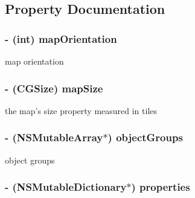 \subsection{Property Documentation}
\hypertarget{interface_c_c_t_m_x_tiled_map_a68fcccfad8cdc9997041c92e601dff76}{
\subsubsection[{map\-Orientation}]{\setlength{\rightskip}{0pt plus 5cm}-\/ (int) {\bf map\-Orientation}}}\label{interface_c_c_t_m_x_tiled_map_a68fcccfad8cdc9997041c92e601dff76}
map orientation \hypertarget{interface_c_c_t_m_x_tiled_map_a2dcb62f1acc4639fc7ba2e8045e53113}{
\subsubsection[{map\-Size}]{\setlength{\rightskip}{0pt plus 5cm}-\/ (C\-G\-Size) {\bf map\-Size}}}\label{interface_c_c_t_m_x_tiled_map_a2dcb62f1acc4639fc7ba2e8045e53113}
the map's size property measured in tiles \hypertarget{interface_c_c_t_m_x_tiled_map_a0e4d5c1ec0940e6bc4dcc7a253af8da5}{
\subsubsection[{object\-Groups}]{\setlength{\rightskip}{0pt plus 5cm}-\/ (N\-S\-Mutable\-Array$\ast$) {\bf object\-Groups}}}\label{interface_c_c_t_m_x_tiled_map_a0e4d5c1ec0940e6bc4dcc7a253af8da5}
object groups \hypertarget{interface_c_c_t_m_x_tiled_map_a33c0dc23ec83c6e5c8f6183993ebd59c}{
\subsubsection[{properties}]{\setlength{\rightskip}{0pt plus 5cm}-\/ (N\-S\-Mutable\-Dictionary$\ast$) {\bf properties}}}\label{interface_c_c_t_m_x_tiled_map_a33c0dc23ec83c6e5c8f6183993ebd59c}
